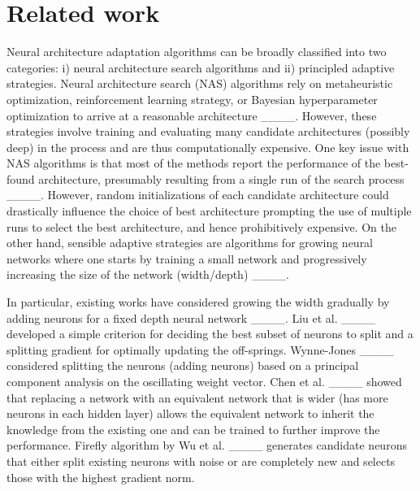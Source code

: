 \section{Related work}
Neural architecture adaptation algorithms can be broadly classified into two categories: i) neural architecture search algorithms and ii) principled adaptive strategies. 
Neural architecture search (NAS) algorithms rely on metaheuristic optimization,  reinforcement learning strategy, or Bayesian hyperparameter optimization to arrive at a reasonable architecture ____. However, these strategies involve training and evaluating many candidate architectures (possibly deep) in the process and are thus computationally expensive. One key issue with NAS algorithms is that most of the methods report the performance of the best-found architecture, presumably resulting from a single run of the search process ____. However,  random initializations of each candidate architecture could drastically influence the choice of best architecture prompting the use of multiple runs to select the best architecture, and hence prohibitively expensive. 
On the other hand, sensible adaptive strategies  are algorithms for growing neural networks where one
starts by training a small network and progressively increasing the size of the network (width/depth) ____.

In particular, existing works have considered growing the width gradually by adding neurons for a fixed depth neural network ____. Liu et al. ____ developed a simple criterion for
deciding the best subset of neurons to split and a splitting gradient for optimally updating the off-springs.  Wynne-Jones ____  considered splitting the neurons (adding neurons) based on a principal component analysis on the oscillating weight vector.  Chen et al. ____ showed that replacing a network with an equivalent network that is wider (has more neurons in
each hidden layer) allows the equivalent network to inherit the knowledge from the existing one and can be trained to further improve the performance. Firefly algorithm by Wu et al. ____ generates candidate neurons that either split existing
neurons with noise or are completely new and selects those with the highest gradient norm.



